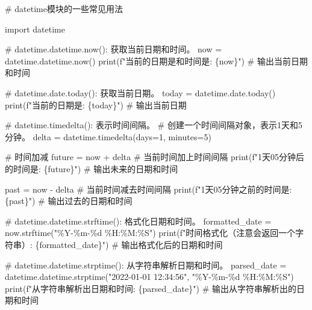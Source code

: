 \documentclass[
  letterpaper,
  DIV=11,
  numbers=noendperiod]{scrreprt}
\newenvironment{Shaded}{\begin{snugshade}}{\end{snugshade}}
\newcommand{\BuiltInTok}[1]{\textcolor[rgb]{0.00,0.23,0.31}{#1}}
\newcommand{\CommentTok}[1]{\textcolor[rgb]{0.37,0.37,0.37}{#1}}
\newcommand{\DecValTok}[1]{\textcolor[rgb]{0.68,0.00,0.00}{#1}}
\newcommand{\ImportTok}[1]{\textcolor[rgb]{0.00,0.46,0.62}{#1}}
\newcommand{\NormalTok}[1]{\textcolor[rgb]{0.00,0.23,0.31}{#1}}
\newcommand{\OperatorTok}[1]{\textcolor[rgb]{0.37,0.37,0.37}{#1}}
\newcommand{\SpecialCharTok}[1]{\textcolor[rgb]{0.37,0.37,0.37}{#1}}
\newcommand{\SpecialStringTok}[1]{\textcolor[rgb]{0.13,0.47,0.30}{#1}}
\newcommand{\StringTok}[1]{\textcolor[rgb]{0.13,0.47,0.30}{#1}}
\begin{document}
\begin{Shaded}
\begin{Highlighting}[]
\CommentTok{\# datetime模块的一些常见用法}

\ImportTok{import}\NormalTok{ datetime}

\CommentTok{\# datetime.datetime.now(): 获取当前日期和时间。}
\NormalTok{now }\OperatorTok{=}\NormalTok{ datetime.datetime.now()}
\BuiltInTok{print}\NormalTok{(}\SpecialStringTok{f"当前的日期是和时间是: }\SpecialCharTok{\{}\NormalTok{now}\SpecialCharTok{\}}\SpecialStringTok{"}\NormalTok{)  }\CommentTok{\# 输出当前日期和时间}

\CommentTok{\# datetime.date.today(): 获取当前日期。}
\NormalTok{today }\OperatorTok{=}\NormalTok{ datetime.date.today()}
\BuiltInTok{print}\NormalTok{(}\SpecialStringTok{f"当前的日期是: }\SpecialCharTok{\{}\NormalTok{today}\SpecialCharTok{\}}\SpecialStringTok{"}\NormalTok{)  }\CommentTok{\# 输出当前日期}

\CommentTok{\# datetime.timedelta(): 表示时间间隔。}
\CommentTok{\# 创建一个时间间隔对象，表示1天和5分钟。}
\NormalTok{delta }\OperatorTok{=}\NormalTok{ datetime.timedelta(days}\OperatorTok{=}\DecValTok{1}\NormalTok{, minutes}\OperatorTok{=}\DecValTok{5}\NormalTok{)}

\CommentTok{\# 时间加减}
\NormalTok{future }\OperatorTok{=}\NormalTok{ now }\OperatorTok{+}\NormalTok{ delta  }\CommentTok{\# 当前时间加上时间间隔}
\BuiltInTok{print}\NormalTok{(}\SpecialStringTok{f"1天05分钟后的时间是: }\SpecialCharTok{\{}\NormalTok{future}\SpecialCharTok{\}}\SpecialStringTok{"}\NormalTok{)  }\CommentTok{\# 输出未来的日期和时间}

\NormalTok{past }\OperatorTok{=}\NormalTok{ now }\OperatorTok{{-}}\NormalTok{ delta  }\CommentTok{\# 当前时间减去时间间隔}
\BuiltInTok{print}\NormalTok{(}\SpecialStringTok{f"1天05分钟之前的时间是: }\SpecialCharTok{\{}\NormalTok{past}\SpecialCharTok{\}}\SpecialStringTok{"}\NormalTok{)  }\CommentTok{\# 输出过去的日期和时间}

\CommentTok{\# datetime.datetime.strftime(): 格式化日期和时间。}
\NormalTok{formatted\_date }\OperatorTok{=}\NormalTok{ now.strftime(}\StringTok{"\%Y{-}\%m{-}}\SpecialCharTok{\%d}\StringTok{ \%H:\%M:\%S"}\NormalTok{)}
\BuiltInTok{print}\NormalTok{(}\SpecialStringTok{f"时间格式化（注意会返回一个字符串）: }\SpecialCharTok{\{}\NormalTok{formatted\_date}\SpecialCharTok{\}}\SpecialStringTok{"}\NormalTok{)  }\CommentTok{\# 输出格式化后的日期和时间}

\CommentTok{\# datetime.datetime.strptime(): 从字符串解析日期和时间。}
\NormalTok{parsed\_date }\OperatorTok{=}\NormalTok{ datetime.datetime.strptime(}\StringTok{"2022{-}01{-}01 12:34:56"}\NormalTok{, }\StringTok{"\%Y{-}\%m{-}}\SpecialCharTok{\%d}\StringTok{ \%H:\%M:\%S"}\NormalTok{)}
\BuiltInTok{print}\NormalTok{(}\SpecialStringTok{f"从字符串解析出日期和时间: }\SpecialCharTok{\{}\NormalTok{parsed\_date}\SpecialCharTok{\}}\SpecialStringTok{"}\NormalTok{)  }\CommentTok{\# 输出从字符串解析出的日期和时间}
\end{Highlighting}
\end{Shaded}
\end{document}

